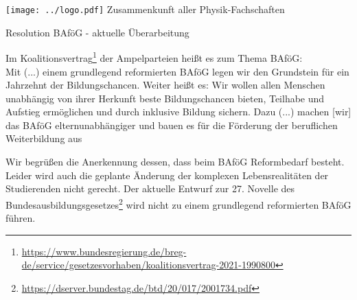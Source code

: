 \documentclass[DIV=calc]{scrartcl}
\let\oldgrqq=\grqq
\def\grqq{\oldgrqq\xspace}
\begin{document}
\hspace{0.87\textwidth}
\begin{minipage}{120pt}
	\vspace{-1.8cm}
	\texttt{[image: ../logo.pdf]}
	\centering
	\small Zusammenkunft aller Physik-Fachschaften
\end{minipage}

\begin{center}
  \huge{Resolution BAföG - aktuelle Überarbeitung}\vspace{.25\baselineskip}\\
  \normalsize
\end{center}
\vspace{1cm}







Im Koalitionsvertrag\footnote{\url{https://www.bundesregierung.de/breg-de/service/gesetzesvorhaben/koalitionsvertrag-2021-1990800}} der Ampelparteien heißt es zum Thema BAföG: \\
\glqq Mit (...) einem grundlegend reformierten BAföG legen wir den Grundstein für ein Jahrzehnt der Bildungschancen.\grqq
Weiter heißt es:
\glqq Wir wollen allen Menschen unabhängig von ihrer Herkunft beste Bildungschancen bieten, Teilhabe und Aufstieg ermöglichen und durch inklusive Bildung sichern. Dazu (...) machen [wir] das BAföG elternunabhängiger und bauen es für die Förderung der beruflichen Weiterbildung aus\grqq

Wir begrüßen die Anerkennung dessen, dass beim BAföG Reformbedarf besteht. Leider wird auch die geplante Änderung der komplexen Lebensrealitäten der Studierenden nicht gerecht. Der aktuelle Entwurf zur 27. Novelle des Bundesausbildungsgesetzes\footnote{\url{https://dserver.bundestag.de/btd/20/017/2001734.pdf}} wird nicht zu einem grundlegend reformierten BAföG führen. 
\end{document}
